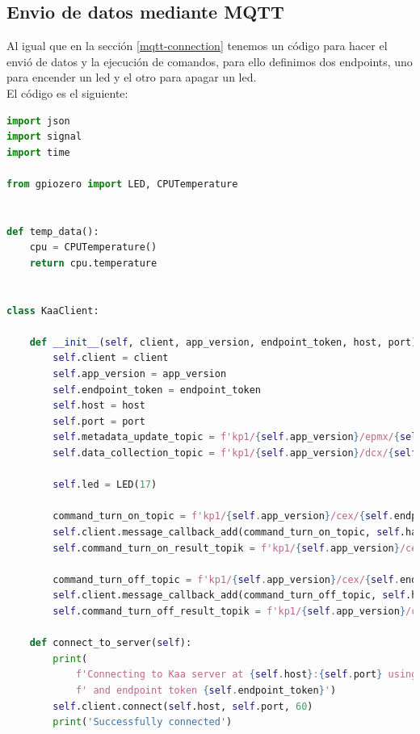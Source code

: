 \subsection{Envio de datos mediante MQTT}

Al igual que en la sección \ref{mqtt-connection} tenemos un código para hacer el envió de datos y la ejecución de comandos, para ello definimos dos endpoints, uno para encender un led y el otro para apagar un led. \\


El código es el siguiente:

\begin{lstlisting}[language=Python]
import json
import signal
import time

from gpiozero import LED, CPUTemperature


def temp_data():
    cpu = CPUTemperature()
    return cpu.temperature


class KaaClient:

    def __init__(self, client, app_version, endpoint_token, host, port):
        self.client = client
        self.app_version = app_version
        self.endpoint_token = endpoint_token
        self.host = host
        self.port = port
        self.metadata_update_topic = f'kp1/{self.app_version}/epmx/{self.endpoint_token}/update/keys'
        self.data_collection_topic = f'kp1/{self.app_version}/dcx/{self.endpoint_token}/json'

        self.led = LED(17)

        command_turn_on_topic = f'kp1/{self.app_version}/cex/{self.endpoint_token}/command/turnon/status'
        self.client.message_callback_add(command_turn_on_topic, self.handle_turn_on_command)
        self.command_turn_on_result_topik = f'kp1/{self.app_version}/cex/{self.endpoint_token}/result/turnon'

        command_turn_off_topic = f'kp1/{self.app_version}/cex/{self.endpoint_token}/command/turnoff/status'
        self.client.message_callback_add(command_turn_off_topic, self.handle_turn_off_command)
        self.command_turn_off_result_topik = f'kp1/{self.app_version}/cex/{self.endpoint_token}/result/turnoff'

    def connect_to_server(self):
        print(
            f'Connecting to Kaa server at {self.host}:{self.port} using application version {self.app_version}'
            f' and endpoint token {self.endpoint_token}')
        self.client.connect(self.host, self.port, 60)
        print('Successfully connected')


\end{lstlisting}
